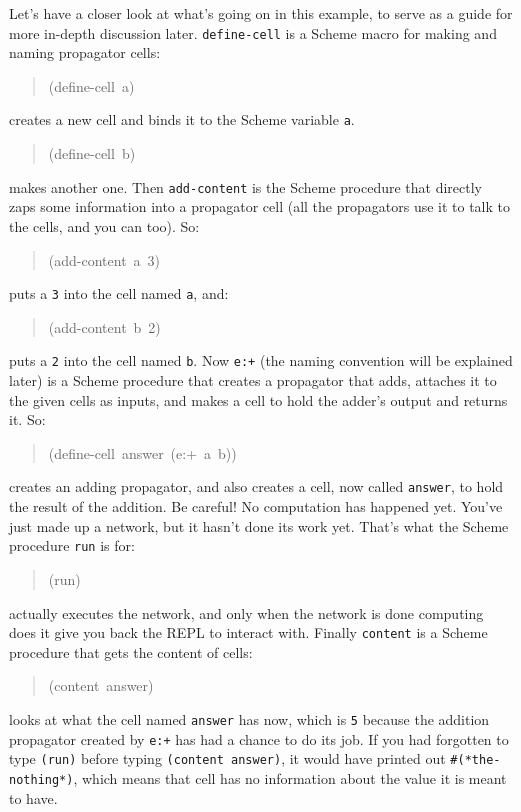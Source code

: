 \documentclass[12pt,letterpaper,english]{article}
\begin{document}
Let's have a closer look at what's going on in this example, to serve
as a guide for more in-depth discussion later.  \texttt{define-cell} is a
Scheme macro for making and naming propagator cells:
\begin{quote}{\ttfamily \raggedright \noindent
(define-cell~a)
}\end{quote}
creates a new cell and binds it to the Scheme variable \texttt{a}.
\begin{quote}{\ttfamily \raggedright \noindent
(define-cell~b)
}\end{quote}
makes another one.  Then \texttt{add-content} is the Scheme procedure that
directly zaps some information into a propagator cell (all the
propagators use it to talk to the cells, and you can too).  So:
\begin{quote}{\ttfamily \raggedright \noindent
(add-content~a~3)
}\end{quote}
puts a \texttt{3} into the cell named \texttt{a}, and:
\begin{quote}{\ttfamily \raggedright \noindent
(add-content~b~2)
}\end{quote}
puts a \texttt{2} into the cell named \texttt{b}.  Now \texttt{e:+} (the naming
convention will be explained later) is a Scheme procedure that creates
a propagator that adds, attaches it to the given cells as inputs, and
makes a cell to hold the adder's output and returns it.  So:
\begin{quote}{\ttfamily \raggedright \noindent
(define-cell~answer~(e:+~a~b))
}\end{quote}
creates an adding propagator, and also creates a cell, now called
\texttt{answer}, to hold the result of the addition.  Be careful!  No
computation has happened yet.  You've just made up a network, but it
hasn't done its work yet.  That's what the Scheme procedure \texttt{run} is
for:
\begin{quote}{\ttfamily \raggedright \noindent
(run)
}\end{quote}
actually executes the network, and only when the network is done
computing does it give you back the REPL to interact with.  Finally
\texttt{content} is a Scheme procedure that gets the content of cells:
\begin{quote}{\ttfamily \raggedright \noindent
(content~answer)
}\end{quote}
looks at what the cell named \texttt{answer} has now, which is \texttt{5}
because the addition propagator created by \texttt{e:+} has had a chance to
do its job.  If you had forgotten to type \texttt{(run)} before typing
\texttt{(content answer)}, it would have printed out \texttt{{\#}(*the-nothing*)},
which means that cell has no information about the value it is meant
to have.
\end{document}
